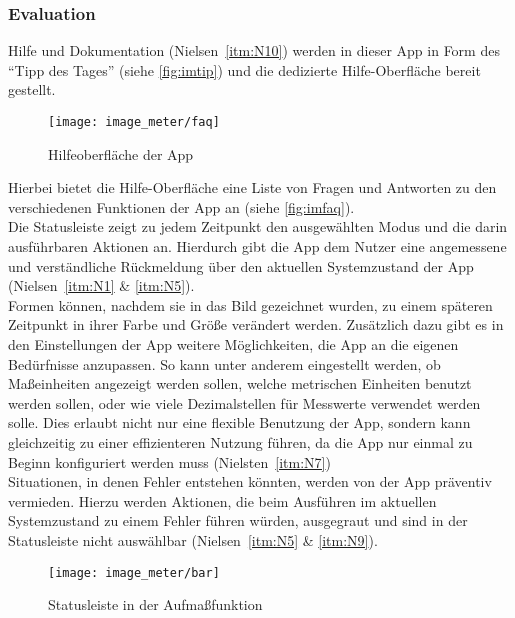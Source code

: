 \subsubsection{Evaluation}\label{subsec:imeva}
Hilfe und Dokumentation (Nielsen~\autoref{itm:N10}) werden in dieser App in Form des ``Tipp des Tages'' (siehe \autoref{fig:imtip}) und die dedizierte Hilfe-Oberfläche bereit gestellt.

\begin{wrapfigure}{R}{0.5\textwidth}
  \centering
  \texttt{[image: image\_meter/faq]}
  \caption{Hilfeoberfläche der App}
  \label{fig:imfaq}
\end{wrapfigure}

Hierbei bietet die Hilfe-Oberfläche eine Liste von Fragen und Antworten zu den verschiedenen Funktionen der App an (siehe \autoref{fig:imfaq}). \\

Die Statusleiste zeigt zu jedem Zeitpunkt den ausgewählten Modus und die darin ausführbaren Aktionen an.
Hierdurch gibt die App dem Nutzer eine angemessene und verständliche Rückmeldung über den aktuellen Systemzustand der App (Nielsen~\autoref{itm:N1} \& \autoref{itm:N5}). \\

Formen können, nachdem sie in das Bild gezeichnet wurden, zu einem späteren Zeitpunkt in ihrer Farbe und Größe verändert werden.
Zusätzlich dazu gibt es in den Einstellungen der App weitere Möglichkeiten, die App an die eigenen Bedürfnisse anzupassen.
So kann unter anderem eingestellt werden, ob Maßeinheiten angezeigt werden sollen, welche metrischen Einheiten benutzt werden sollen, oder wie viele Dezimalstellen für Messwerte verwendet werden solle.
Dies erlaubt nicht nur eine flexible Benutzung der App, sondern kann gleichzeitig zu einer effizienteren Nutzung führen, da die App nur einmal zu Beginn konfiguriert werden muss (Nielsten~\autoref{itm:N7}) \\

Situationen, in denen Fehler entstehen könnten, werden von der App präventiv vermieden.
Hierzu werden Aktionen, die beim Ausführen im aktuellen Systemzustand zu einem Fehler führen würden, ausgegraut und sind in der Statusleiste nicht auswählbar (Nielsen~\autoref{itm:N5} \& \autoref{itm:N9}). \\

\begin{wrapfigure}{R}{0.5\textwidth}
  \centering
  \texttt{[image: image\_meter/bar]}
  \caption{Statusleiste in der Aufmaßfunktion}
  \label{fig:imbar}
\end{wrapfigure}

